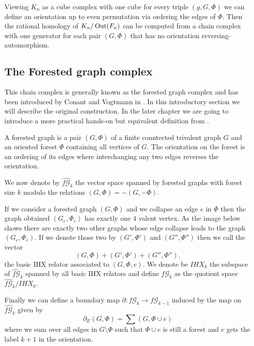 
Viewing $K_{n}$ as a cube complex with one cube for every triple $(g,G,\Phi)$ we can define an orientation up to even permutation
via ordering the edges of $\Phi$. Then the rational homology of $K_{n} / \operatorname{Out}(F_{n})$ can be
computed from a chain complex with one generator for each pair $(G,\Phi)$ that has no orientation
reversing-automorphism.

\subsection{The Forested graph complex}
This chain complex is generally known as the forested graph complex and has been
introduced by Conant and Vogtmann in \cite{conant03}. In this introductory section
we will describe the original construction. In the later chapter we are going to
introduce a more practical hands-on but equivalent definition from \cite{conant08}.

\begin{definition}
	A forested graph is a pair $(G,\Phi)$ of a finite conntected trivalent graph $G$ and an oriented forest $\Phi$ containing all vertices of $G$.
	The orientation on the forest is an ordering of its edges where interchanging any two edges reverses the orientation.
\end{definition}

We now denote by $\widehat{f\mathcal{G}}_{k}$ the vector space spanned by forested graphs with forest size $k$ modulo the relations
$(G,\Phi) = -(G,-\Phi)$.

If we consider a forested graph $(G,\Phi)$ and we collapse an edge $e$ in $\Phi$ then the graph obtained $(G_{e},\Phi_{e})$ 
has exactly one $4$ valent vertex. As the image below shows there are exactly two other graphs
whose edge collapse leads to the graph $(G_{e},\Phi_{e})$.
If we denote those two by $(G',\Phi')$ and  $(G'',\Phi'')$ then we call the vector
\[
	(G,\Phi) + (G',\Phi') + (G'',\Phi'')
.\] 
the basic IHX relator associated to $(G,\Phi,e)$. 
We denote be $IHX_{k}$ the subspace of $\widehat{f\mathcal{G}}_{k}$ spanned by all basic IHX relators
and define $f\mathcal{G}_{k}$ as the quotient space $\widehat{f\mathcal{G}}_{k} / IHX_{k}$.

Finally we can define a boundary map  $\partial: f\mathcal{G}_{k} \to f\mathcal{G}_{k-1}$ induced by the map on $\widehat{f \mathcal{G}}_{k}$ given by
\[
	\partial_{E}(G,\Phi) = \sum (G,\Phi \cup e)
\] 
where we sum over all edges in $G \setminus \Phi$ such that $\Phi \cup e$ is still a forest and 
$e$ gets the label $k+1$ in the orientation.

